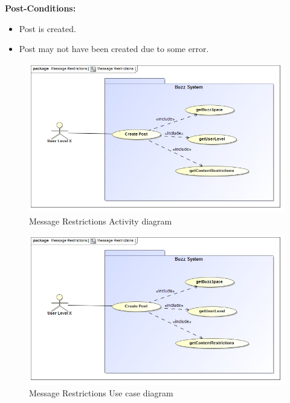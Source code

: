 \documentclass[11pt]{article}
\begin{document}
\begin{enumerate}
\begin{itemize}
\textbf{Post-Conditions: }
	\begin{itemize}
	\item Post is created.
	\item Post may not have been created due to some error.
	\end{itemize}
\end{itemize}

\graphicspath{ {../Diagrams/Kyhle/Use_Case_Diagrams/} }	    	
	\begin{figure}[H]	
    	\includegraphics[scale=0.5]{messageRestrictions.jpg}
    	\caption{Message Restrictions Activity diagram}
	\end{figure}
\graphicspath{ {../Diagrams/Kyhle/Activity_Diagrams/} }
	\begin{figure}[H]	
    	\includegraphics[scale=0.5]{messageRestrictions.jpg}
    	\caption{Message Restrictions Use case diagram}
	\end{figure}

































\end{enumerate}
\end{document}
